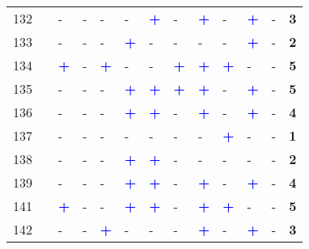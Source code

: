 \begin{longtable}{p{0.5cm}p{4.6cm}p{0.3cm}p{0.3cm}p{0.3cm}p{0.3cm}p{0.3cm}p{0.3cm}p{0.3cm}p{0.3cm}p{0.3cm}p{0.3cm}p{1cm}}
    \small{132} & \small{\textcite{ma_connecting_2022}}\index{Ma, Qingyu|pagebf} & - & - & - & - & \textcolor{blue}{\textbf{+}} & - & \textcolor{blue}{\textbf{+}} & - & \textcolor{blue}{\textbf{+}} & - & \textbf{3}\\
    \small{133} & \small{\textcite{ma_estimating_2019}}\index{Ma, Ting|pagebf} & - & - & - & \textcolor{blue}{\textbf{+}} & - & - & - & - & \textcolor{blue}{\textbf{+}} & - & \textbf{2}\\
    \small{134} & \small{\textcite{ma_bicycle_2015}}\index{Ma, Ting|pagebf} & \textcolor{blue}{\textbf{+}} & - & \textcolor{blue}{\textbf{+}} & - & - & \textcolor{blue}{\textbf{+}} & \textcolor{blue}{\textbf{+}} & \textcolor{blue}{\textbf{+}} & - & - & \textbf{5}\\
    \small{135} & \small{\textcite{ma_understanding_2018}}\index{Ma, Xinwei|pagebf} & - & - & - & \textcolor{blue}{\textbf{+}} & \textcolor{blue}{\textbf{+}} & \textcolor{blue}{\textbf{+}} & \textcolor{blue}{\textbf{+}} & - & \textcolor{blue}{\textbf{+}} & - & \textbf{5}\\
    \small{136} & \small{\textcite{ma_measuring_2018}}\index{Ma, Xinwei|pagebf} & - & - & - & \textcolor{blue}{\textbf{+}} & \textcolor{blue}{\textbf{+}} & - & \textcolor{blue}{\textbf{+}} & - & \textcolor{blue}{\textbf{+}} & - & \textbf{4}\\
    \small{137} & \small{\textcite{ma_impacts_2019}}\index{Ma, Xiaolei|pagebf} & - & - & - & - & - & - & - & \textcolor{blue}{\textbf{+}} & - & - & \textbf{1}\\
    \small{138} & \small{\textcite{marques_potential_2017}}\index{Marques, R.|pagebf} & - & - & - & \textcolor{blue}{\textbf{+}} & \textcolor{blue}{\textbf{+}} & - & - & - & - & - & \textbf{2}\\
    \small{139} & \small{\textcite{martens_bicycle_2004}}\index{Martens, Karel|pagebf} & - & - & - & \textcolor{blue}{\textbf{+}} & \textcolor{blue}{\textbf{+}} & - & \textcolor{blue}{\textbf{+}} & - & \textcolor{blue}{\textbf{+}} & - & \textbf{4}\\
    \small{141} & \small{\textcite{martin_evaluating_2014}}\index{Martin, Elliot W.|pagebf} & \textcolor{blue}{\textbf{+}} & - & - & \textcolor{blue}{\textbf{+}} & \textcolor{blue}{\textbf{+}} & - & \textcolor{blue}{\textbf{+}} & \textcolor{blue}{\textbf{+}} & - & - & \textbf{5}\\
    \small{142} & \small{\textcite{mcqueen_assessing_2022}}\index{McQueen, Michael|pagebf} & - & - & \textcolor{blue}{\textbf{+}} & - & - & - & \textcolor{blue}{\textbf{+}} & - & \textcolor{blue}{\textbf{+}} & - & \textbf{3}\\

\end{longtable}
